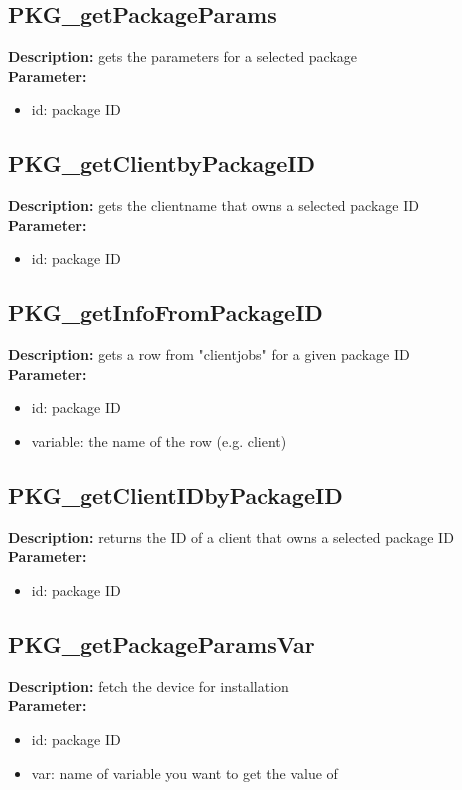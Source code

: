 \subsection{PKG\_getPackageParams}
\textbf{Description:} gets the parameters for a selected package\\
\textbf{Parameter:}
\begin{itemize}
\item id: package ID
\end{itemize}

\subsection{PKG\_getClientbyPackageID}
\textbf{Description:} gets the clientname that owns a selected package ID\\
\textbf{Parameter:}
\begin{itemize}
\item id: package ID
\end{itemize}

\subsection{PKG\_getInfoFromPackageID}
\textbf{Description:} gets a row from "clientjobs" for a given package ID\\
\textbf{Parameter:}
\begin{itemize}
\item id: package ID
\item variable: the name of the row (e.g. client)
\end{itemize}

\subsection{PKG\_getClientIDbyPackageID}
\textbf{Description:} returns the ID of a client that owns a selected package ID\\
\textbf{Parameter:}
\begin{itemize}
\item id: package ID
\end{itemize}

\subsection{PKG\_getPackageParamsVar}
\textbf{Description:} fetch the device for installation\\
\textbf{Parameter:}
\begin{itemize}
\item id: package ID
\item var: name of variable you want to get the value of
\end{itemize}

